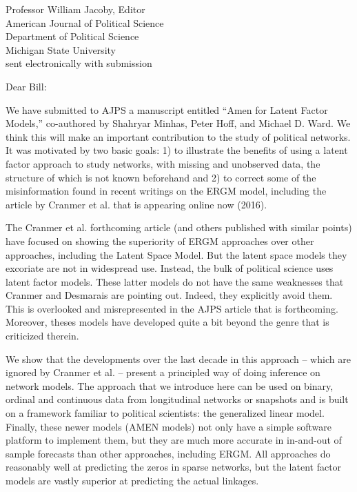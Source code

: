 \documentclass[10pt]{letter}
\begin{document}
\begin{letter}
{Professor William Jacoby, Editor\\
American Journal of Political Science\\
Department of Political Science\\
Michigan State University\\
sent electronically with submission}


\opening{Dear Bill:}

We have submitted to AJPS a manuscript entitled ``Amen for Latent Factor Models,'' co-authored by Shahryar Minhas, Peter Hoff, and Michael D. Ward.  We think this will make an important contribution to the study of political networks.  It was motivated by two basic goals: 1) to illustrate the benefits of using a latent factor approach to study networks, with missing and unobserved data, the structure of which is not known beforehand and 2) to correct some of the misinformation found in recent writings on the ERGM model, including the article by Cranmer et al. that is appearing online now (2016).

The Cranmer et al. forthcoming article (and others published with similar points) have focused on showing the superiority of ERGM approaches over other approaches, including the Latent Space Model.  But the latent space models they excoriate are not in widespread use. Instead, the bulk of political science uses latent factor models. These latter models do not have the same weaknesses that Cranmer and Desmarais are pointing out. Indeed, they explicitly avoid them. This is overlooked and misrepresented in the AJPS article that is forthcoming. Moreover, theses models have developed quite a bit beyond the genre that is criticized therein.  

We show that the developments over the last decade in this approach -- which are ignored by Cranmer et al. -- present a principled way of doing inference on network models. The approach that we introduce here can be used on binary, ordinal and continuous data from longitudinal networks or snapshots and is built on a framework familiar to political scientists: the generalized linear model. Finally, these newer models (AMEN models) not only have a simple software platform to implement them, but they are much more accurate in in-and-out of sample forecasts than other approaches, including ERGM.  All approaches do reasonably well at predicting the zeros in sparse networks, but the latent factor models are vastly superior at predicting the actual linkages. 


\end{letter}
\end{document}
